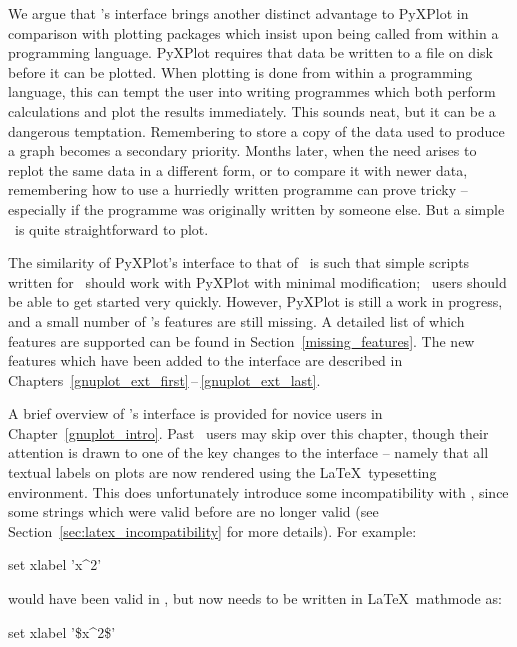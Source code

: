 We argue that \gnuplot's interface brings another distinct advantage to PyXPlot
in comparison with plotting packages which insist upon being called from within
a programming language. PyXPlot requires that data be written to a file on disk
before it can be plotted. When plotting is done from within a programming
language, this can tempt the user into writing programmes which both perform
calculations and plot the results immediately.  This sounds neat, but it can be
a dangerous temptation. Remembering to store a copy of the data used to produce
a graph becomes a secondary priority.  Months later, when the need arises to
replot the same data in a different form, or to compare it with newer data,
remembering how to use a hurriedly written programme can prove tricky --
especially if the programme was originally written by someone else. But a simple
\datafile\ is quite straightforward to plot.

The similarity of PyXPlot's interface to that of \gnuplot\ is such that simple
scripts written for \gnuplot\ should work with PyXPlot with minimal
modification; \gnuplot\ users should be able to get started very quickly.
However, PyXPlot is still a work in progress, and a small number of \gnuplot's
features are still missing.  A detailed list of which features are supported
can be found in Section~\ref{missing_features}. The new features which have
been added to the interface are described in
Chapters~\ref{gnuplot_ext_first}\,--\,\ref{gnuplot_ext_last}.

A brief overview of \gnuplot's interface is provided for novice users in
Chapter~\ref{gnuplot_intro}. Past \gnuplot\ users may skip over this chapter,
though their attention is drawn to one of the key changes to the interface --
namely that all textual labels on plots are now rendered using the \LaTeX\
typesetting environment. This does unfortunately introduce some incompatibility
with \gnuplot, since some strings which were valid before are no longer valid
(see Section~\ref{sec:latex_incompatibility} for more details). For
example:\index{latex}

\begin{dontdo}
set xlabel 'x\^{}2'
\end{dontdo}

\noindent would have been valid in \gnuplot, but now needs to be written in
\LaTeX\ mathmode as:

\begin{dodo}
set xlabel '\$x\^{}2\$'
\end{dodo}

